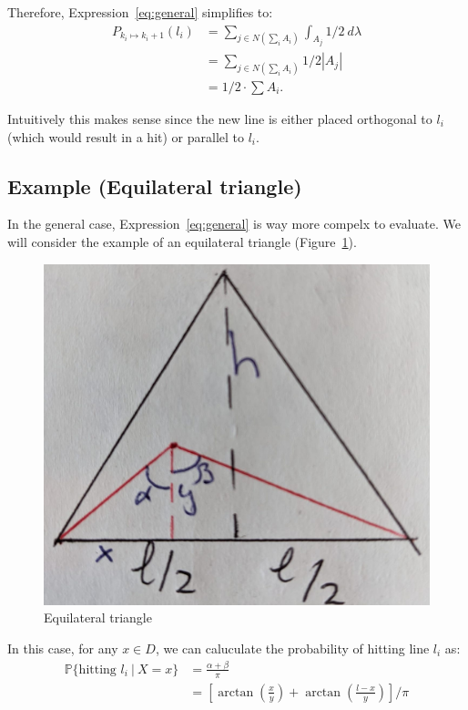 \documentclass{article}
\theoremstyle{definition}
\theoremstyle{remark}
\begin{document}
Therefore, Expression~\eqref{eq:general} simplifies to:
\begin{align}
    P_{k_i\mapsto k_i+1}(l_i) &= \sum_{j \in N(\sum_{i}A_i)} \int_{A_j} 1/2 \ d\lambda \\
    &= \sum_{j \in N(\sum_{i}A_i)} 1/2 |A_j| \\ 
    &= 1/2 \cdot \sum A_i.
\end{align}

Intuitively this makes sense since the new line is either placed orthogonal to $l_i$ (which would result in a hit) or parallel to $l_i$.

\subsection{Example (Equilateral triangle)}
In the general case, Expression~\eqref{eq:general} is way more compelx to evaluate. We will consider the example of an equilateral triangle (Figure~\ref{fig:EquilateralTriangle}).

\begin{figure}[h!]
    \centering
    \includegraphics[width=\linewidth]{Figures/EquilateralTriangle.jpeg}
    \caption{Equilateral triangle}
    \label{fig:EquilateralTriangle}
\end{figure}

In this case, for any $x\in D$, we can caluculate the probability of hitting line $l_i$ as:
\begin{align*}
    \mathbb{P}\{ \text{hitting } l_i \ | \ X=x \} &= \frac{\alpha + \beta}{\pi} \\
    &= \left[ \arctan\left( \frac{x}{y} \right) + \arctan\left( \frac{l-x}{y}  \right) \right] / \pi \\
\end{align*}
\end{document}
